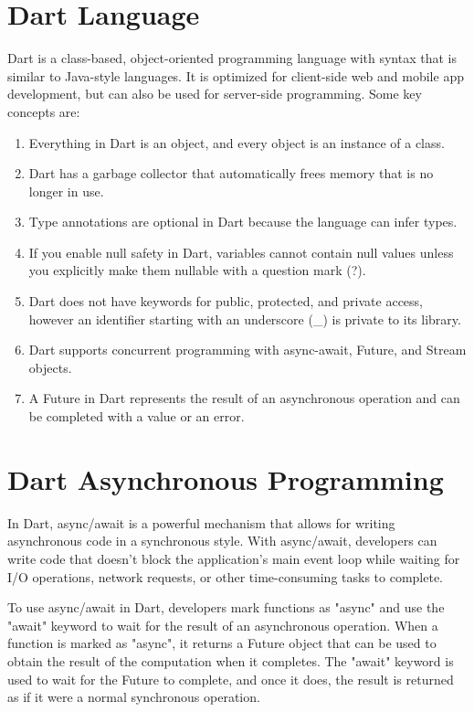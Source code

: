 \documentclass[conference]{IEEEtran}
\begin{document}
\section{Dart Language}

Dart is a class-based, object-oriented programming language with syntax that is similar to Java-style languages. It is optimized for client-side web and mobile app development, but can also be used for server-side programming. Some key concepts are:

\begin{enumerate}
	\item Everything in Dart is an object, and every object is an instance of a class.
	\item Dart has a garbage collector that automatically frees memory that is no longer in use. 
	\item Type annotations are optional in Dart because the language can infer types.
	\item If you enable null safety in Dart, variables cannot contain null values unless you explicitly make them nullable with a question mark (?).
	\item Dart does not have keywords for public, protected, and private access, however an identifier starting with an underscore (\_) is private to its library.
	\item Dart supports concurrent programming with async-await, Future, and Stream objects.
	\item A Future in Dart represents the result of an asynchronous operation and can be completed with a value or an error.
\end{enumerate}

\section{Dart Asynchronous Programming}
In Dart, async/await is a powerful mechanism that allows for writing asynchronous code in a synchronous style. With async/await, developers can write code that doesn't block the application's main event loop while waiting for I/O operations, network requests, or other time-consuming tasks to complete.

To use async/await in Dart, developers mark functions as "async" and use the "await" keyword to wait for the result of an asynchronous operation. When a function is marked as "async", it returns a Future object that can be used to obtain the result of the computation when it completes. The "await" keyword is used to wait for the Future to complete, and once it does, the result is returned as if it were a normal synchronous operation.
\end{document}
